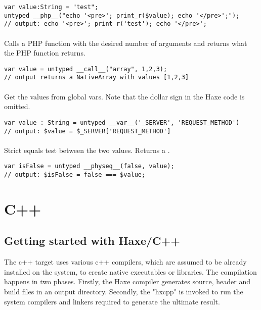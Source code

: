 \begin{lstlisting}
var value:String = "test";
untyped __php__("echo '<pre>'; print_r($value); echo '</pre>';");
// output: echo '<pre>'; print_r('test'); echo '</pre>';
\end{lstlisting}

\paragraph{}
Calls a PHP function with the desired number of arguments and returns what the PHP function returns.

\begin{lstlisting}
var value = untyped __call__("array", 1,2,3); 
// output returns a NativeArray with values [1,2,3]
\end{lstlisting}

\paragraph{}
Get the values from global vars. Note that the dollar sign in the Haxe code is omitted.

\begin{lstlisting}
var value : String = untyped __var__('_SERVER', 'REQUEST_METHOD')  
// output: $value = $_SERVER['REQUEST_METHOD']
\end{lstlisting}

\paragraph{}
Strict equals test between the two values. Returns a .

\begin{lstlisting}
var isFalse = untyped __physeq__(false, value);
// output: $isFalse = false === $value;
\end{lstlisting}


\section{C++}
\label{target-cpp}

\subsection{Getting started with Haxe/C++}
\label{target-cpp-getting-started}
The c++ target uses various c++ compilers, which are assumed to be already installed on the system, to create native executables or libraries.  The compilation happens in two phases.  Firstly, the Haxe compiler generates source, header and build files in an output directory.  Secondly, the "hxcpp"  is invoked to run the system compilers and linkers required to generate the ultimate result.

